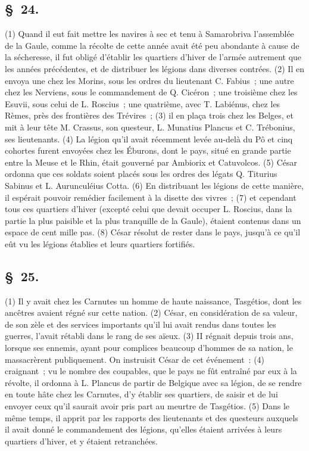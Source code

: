 \documentclass[french,twoside]{book} %
\begin{document}
\subsection[{§ 24.}]{ \textsc{§ 24.} }
\noindent (1) Quand il eut fait mettre les navires à sec et tenu à Samarobriva l’assemblée de la Gaule, comme la récolte de cette année avait été peu abondante à cause de la sécheresse, il fut obligé d’établir les quartiers d’hiver de l’armée autrement que les années précédentes, et de distribuer les légions dans diverses contrées. (2) Il en envoya une chez les Morins, sous les ordres du lieutenant C. Fabius ; une autre chez les Nerviens, sous le commandement de Q. Cicéron ; une troisième chez les Esuvii, sous celui de L. Roscius ; une quatrième, avec T. Labiénus, chez les Rèmes, près des frontières des Trévires ; (3) il en plaça trois chez les Belges, et mit à leur tête M. Crassus, son questeur, L. Munatius Plancus et C. Trébonius, ses lieutenants. (4) La légion qu’il avait récemment levée au-delà du Pô et cinq cohortes furent envoyées chez les Éburons, dont le pays, situé en grande partie entre la Meuse et le Rhin, était gouverné par Ambiorix et Catuvolcos. (5) César ordonna que ces soldats soient placés sous les ordres des légats Q. Titurius Sabinus et L. Aurunculéius Cotta. (6) En distribuant les légions de cette manière, il espérait pouvoir remédier facilement à la disette des vivres ; (7) et cependant tous ces quartiers d’hiver (excepté celui que devait occuper L. Roscius, dans la partie la plus paisible et la plus tranquille de la Gaule), étaient contenus dans un espace de cent mille pas. (8) César résolut de rester dans le pays, jusqu’à ce qu’il eût vu les légions établies et leurs quartiers fortifiés.
\subsection[{§ 25.}]{ \textsc{§ 25.} }
\noindent (1) Il y avait chez les Carnutes un homme de haute naissance, Tasgétios, dont les ancêtres avaient régné sur cette nation. (2) César, en considération de sa valeur, de son zèle et des services importants qu’il lui avait rendus dans toutes les guerres, l’avait rétabli dans le rang de ses aïeux. (3) II régnait depuis trois ans, lorsque ses ennemis, ayant pour complices beaucoup d’hommes de sa nation, le massacrèrent publiquement. On instruisit César de cet événement : (4) craignant ; vu le nombre des coupables, que le pays ne fût entraîné par eux à la révolte, il ordonna à L. Plancus de partir de Belgique avec sa légion, de se rendre en toute hâte chez les Carnutes, d’y établir ses quartiers, de saisir et de lui envoyer ceux qu’il saurait avoir pris part au meurtre de Tasgétios. (5) Dans le même temps, il apprit par les rapports des lieutenants et des questeurs auxquels il avait donné le commandement des légions, qu’elles étaient arrivées à leurs quartiers d’hiver, et y étaient retranchées.
\end{document}
